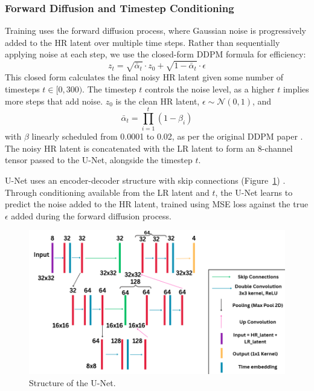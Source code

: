 \documentclass{article} %
\begin{document}
\subsubsection{Forward Diffusion and Timestep Conditioning}

Training uses the forward diffusion process, where Gaussian noise is progressively added to the HR latent over multiple time steps. Rather than sequentially applying noise at each step, we use the closed-form DDPM formula for efficiency:
\[
z_t = \sqrt{\bar{\alpha}_t} \cdot z_0 + \sqrt{1 - \bar{\alpha}_t} \cdot \epsilon
\]
This closed form calculates the final noisy HR latent given some number of timesteps \( t \in [0, 300) \). The timestep \( t \) controls the noise level, as a higher \( t \) implies more steps that add noise. \( z_0 \) is the clean HR latent, \( \epsilon \sim \mathcal{N}(0, 1) \), and
\[
\bar{\alpha}_t = \prod_{i=1}^{t} (1 - \beta_i)
\]
with \( \beta \) linearly scheduled from 0.0001 to 0.02, as per the original DDPM paper \citep{ho20}. The noisy HR latent is concatenated with the LR latent to form an 8-channel tensor passed to the U-Net, alongside the timestep \( t \).

U-Net uses an encoder-decoder structure with skip connections (Figure~\ref{model3}) \citep{ronneberger2015unet}. Through conditioning available from the LR latent and \( t \), the U-Net learns to predict the noise added to the HR latent, trained using MSE loss against the true \( \epsilon \) added during the forward diffusion process.

\begin{figure}[h]
\begin{center}
\includegraphics[width=1\textwidth]{progress/Figs/model3.png}
\end{center}
\caption{Structure of the U-Net.}
\label{model3}
\end{figure}
\end{document}
